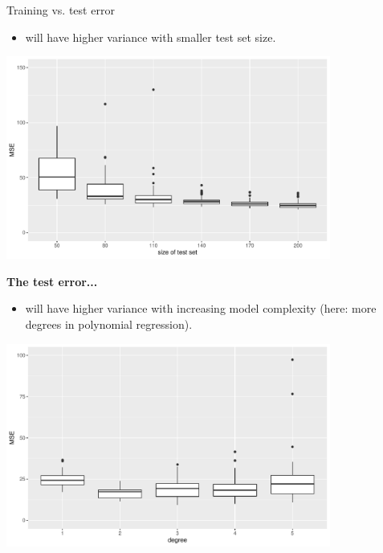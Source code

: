 \begin{vbframe}{Training vs. test error}
\begin{itemize}
  \item will have higher variance with smaller test set size.

\end{itemize}
\begin{center}
\includegraphics[width=0.8\textwidth]{figure/fig-train-vs-test-error-3}
\end{center}  

\framebreak
\textbf{The test error...}

\begin{itemize}    
  
  \item will have higher variance with increasing model complexity (here: more degrees in polynomial regression).
\end{itemize}

\begin{center}
\includegraphics[width=0.8\textwidth]{figure/fig-train-vs-test-error-5}
\end{center} 

\end{vbframe}



